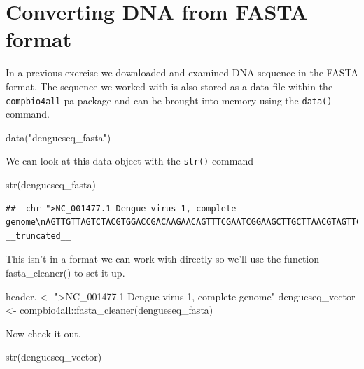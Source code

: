 \documentclass[
]{book}
\newenvironment{Shaded}{\begin{snugshade}}{\end{snugshade}}
\newcommand{\FunctionTok}[1]{\textcolor[rgb]{0.00,0.00,0.00}{#1}}
\newcommand{\NormalTok}[1]{#1}
\newcommand{\OtherTok}[1]{\textcolor[rgb]{0.56,0.35,0.01}{#1}}
\newcommand{\SpecialCharTok}[1]{\textcolor[rgb]{0.00,0.00,0.00}{#1}}
\newcommand{\StringTok}[1]{\textcolor[rgb]{0.31,0.60,0.02}{#1}}
\begin{document}
\hypertarget{converting-dna-from-fasta-format}{%
\section{Converting DNA from FASTA format}\label{converting-dna-from-fasta-format}}

In a previous exercise we downloaded and examined DNA sequence in the FASTA format. The sequence we worked with is also stored as a data file within the \texttt{compbio4all} pa package and can be brought into memory using the \texttt{data()} command.

\begin{Shaded}
\begin{Highlighting}[]
\FunctionTok{data}\NormalTok{(}\StringTok{"dengueseq\_fasta"}\NormalTok{)}
\end{Highlighting}
\end{Shaded}

We can look at this data object with the \texttt{str()} command

\begin{Shaded}
\begin{Highlighting}[]
\FunctionTok{str}\NormalTok{(dengueseq\_fasta)}
\end{Highlighting}
\end{Shaded}

\begin{verbatim}
##  chr ">NC_001477.1 Dengue virus 1, complete genome\nAGTTGTTAGTCTACGTGGACCGACAAGAACAGTTTCGAATCGGAAGCTTGCTTAACGTAGTTCTA"| __truncated__
\end{verbatim}

This isn't in a format we can work with directly so we'll use the function fasta\_cleaner() to set it up.

\begin{Shaded}
\begin{Highlighting}[]
\NormalTok{header. }\OtherTok{\textless{}{-}} \StringTok{"\textgreater{}NC\_001477.1 Dengue virus 1, complete genome"}
\NormalTok{dengueseq\_vector }\OtherTok{\textless{}{-}}\NormalTok{ compbio4all}\SpecialCharTok{::}\FunctionTok{fasta\_cleaner}\NormalTok{(dengueseq\_fasta)}
\end{Highlighting}
\end{Shaded}

Now check it out.

\begin{Shaded}
\begin{Highlighting}[]
\FunctionTok{str}\NormalTok{(dengueseq\_vector)}
\end{Highlighting}
\end{Shaded}
\end{document}

